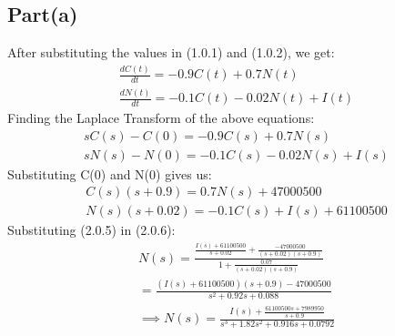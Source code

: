 \documentclass[journal,12pt,twocolumn]{IEEEtran}
\begin{document}
\subsection{Part(a)}
After substituting the values in (1.0.1) and (1.0.2), we get:
\begin{align}
\frac{dC(t)}{dt} = -0.9C(t) + 0.7N(t)
\\\frac{dN(t)}{dt} = -0.1C(t) - 0.02N(t) + I(t)
\end{align}
Finding the Laplace Transform of the above equations:
\begin{align}
sC(s) - C(0) = -0.9C(s) + 0.7N(s)
\\sN(s) - N(0) = -0.1C(s) - 0.02N(s) + I(s)
\end{align}
Substituting C(0) and N(0) gives us:
\begin{align}
C(s)(s + 0.9) = 0.7N(s) + 47000500
\\N(s)(s + 0.02) = -0.1C(s) + I(s) + 61100500
\end{align}
Substituting (2.0.5) in (2.0.6):
\begin{align}
N(s)= \frac{\frac{I(s)+61100500}{s+0.02} + \frac{-47000500}{(s+0.02)(s+0.9)}}{1+\frac{0.07}{(s+0.02)(s + 0.9)}}
\\ = \frac{(I(s)+61100500)(s + 0.9) - 47000500}{s^2 + 0.92s + 0.088}
\\\implies N(s) = \frac{I(s)+ \frac{61100500s + 7989950}{s+0.9}}{s^3 + 1.82s^2 + 0.916s + 0.0792}
\end{align}

\end{document}
